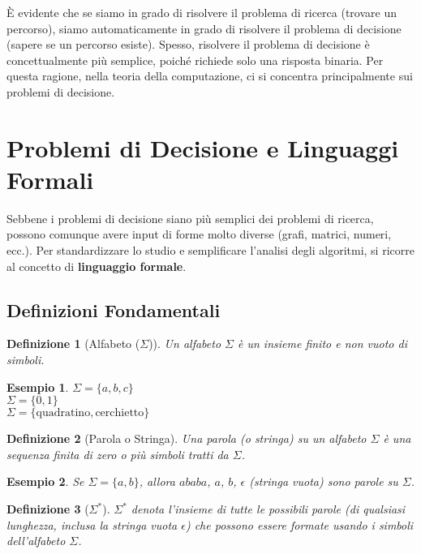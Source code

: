 \documentclass[a4paper]{article}
\newtheorem{definition}{Definizione}
\newtheorem{example}{Esempio}
\begin{document}
È evidente che se siamo in grado di risolvere il problema di ricerca (trovare un percorso), siamo automaticamente in grado di risolvere il problema di decisione (sapere se un percorso esiste). Spesso, risolvere il problema di decisione è concettualmente più semplice, poiché richiede solo una risposta binaria. Per questa ragione, nella teoria della computazione, ci si concentra principalmente sui problemi di decisione.

\section{Problemi di Decisione e Linguaggi Formali}

Sebbene i problemi di decisione siano più semplici dei problemi di ricerca, possono comunque avere input di forme molto diverse (grafi, matrici, numeri, ecc.). Per standardizzare lo studio e semplificare l'analisi degli algoritmi, si ricorre al concetto di \textbf{linguaggio formale}.

\subsection{Definizioni Fondamentali}

\begin{definition}[Alfabeto ($\Sigma$)]
Un alfabeto $\Sigma$ è un insieme finito e non vuoto di simboli.
\end{definition}
\begin{example}
$\Sigma = \{a, b, c\}$ \\
$\Sigma = \{0, 1\}$ \\
$\Sigma = \{\text{quadratino}, \text{cerchietto}\}$
\end{example}

\begin{definition}[Parola o Stringa]
Una parola (o stringa) su un alfabeto $\Sigma$ è una sequenza finita di zero o più simboli tratti da $\Sigma$.
\end{definition}
\begin{example}
Se $\Sigma = \{a, b\}$, allora $ababa$, $a$, $b$, $\epsilon$ (stringa vuota) sono parole su $\Sigma$.
\end{example}

\begin{definition}[$\Sigma^*$]
$\Sigma^*$ denota l'insieme di tutte le possibili parole (di qualsiasi lunghezza, inclusa la stringa vuota $\epsilon$) che possono essere formate usando i simboli dell'alfabeto $\Sigma$.
\end{definition}
\end{document}
